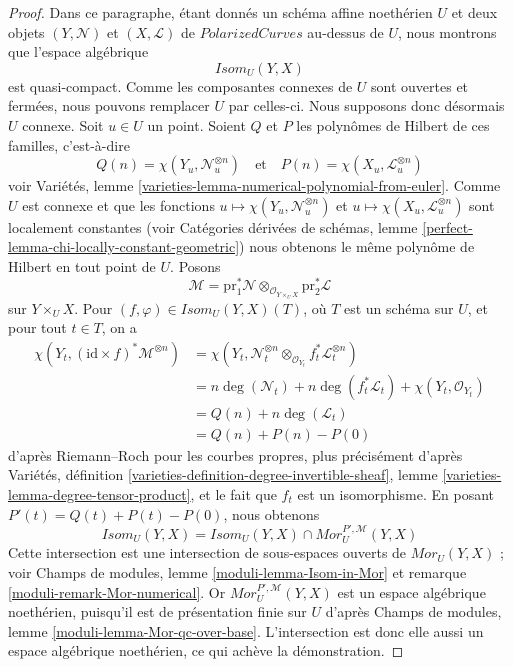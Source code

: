 \begin{proof}
\medskip\noindent
Dans ce paragraphe, étant donnés un schéma affine noethérien $U$ et deux objets
$(Y, \mathcal{N})$ et $(X, \mathcal{L})$
de $\textit{PolarizedCurves}$ au-dessus de $U$, nous montrons que l'espace algébrique
$$
\mathit{Isom}_U(Y, X)
$$
est quasi-compact. Comme les composantes connexes de $U$ sont ouvertes et
fermées, nous pouvons remplacer $U$ par celles-ci. Nous supposons donc
désormais $U$ connexe. Soit $u \in U$ un point. Soient $Q$ et $P$ les
polynômes de Hilbert de ces familles, c'est-à-dire
$$
Q(n) = \chi(Y_u, \mathcal{N}_u^{\otimes n})
\quad\text{et}\quad
P(n) = \chi(X_u, \mathcal{L}_u^{\otimes n})
$$
voir Variétés, lemme \ref{varieties-lemma-numerical-polynomial-from-euler}.
Comme $U$ est connexe et que les fonctions
$u \mapsto \chi(Y_u, \mathcal{N}_u^{\otimes n})$ et
$u \mapsto \chi(X_u, \mathcal{L}_u^{\otimes n})$
 sont localement constantes (voir
Catégories dérivées de schémas, lemme
\ref{perfect-lemma-chi-locally-constant-geometric})
nous obtenons le même polynôme de Hilbert en tout point de $U$.
Posons
$$
\mathcal{M} = \text{pr}_1^*\mathcal{N}
\otimes_{\mathcal{O}_{Y \times_U X}} \text{pr}_2^*\mathcal{L}
$$
sur $Y \times_U X$. Pour
$(f, \varphi) \in \mathit{Isom}_U(Y, X)(T)$, où $T$ est un schéma sur $U$,
et pour tout $t \in T$, on a
\begin{align*}
\chi(Y_t, (\text{id} \times f)^*\mathcal{M}^{\otimes n})
& =
\chi(Y_t,
\mathcal{N}_t^{\otimes n} \otimes_{\mathcal{O}_{Y_t}}
f_t^*\mathcal{L}_t^{\otimes n}) \\
& =
n\deg(\mathcal{N}_t) + n\deg(f_t^*\mathcal{L}_t) +
\chi(Y_t, \mathcal{O}_{Y_t}) \\
& =
Q(n) + n\deg(\mathcal{L}_t) \\
& =
Q(n) + P(n) - P(0)
\end{align*}
d'après Riemann--Roch pour les courbes propres, plus précisément d'après
Variétés, définition \ref{varieties-definition-degree-invertible-sheaf},
lemme \ref{varieties-lemma-degree-tensor-product},
et le fait que $f_t$ est un isomorphisme.
En posant $P'(t) = Q(t) + P(t) - P(0)$, nous obtenons
$$
\mathit{Isom}_U(Y, X) =
\mathit{Isom}_U(Y, X) \cap \mathit{Mor}^{P', \mathcal{M}}_U(Y, X)
$$
Cette intersection est une intersection de sous-espaces ouverts de
$\mathit{Mor}_U(Y, X)$ ; voir Champs de modules, lemme
\ref{moduli-lemma-Isom-in-Mor} et remarque
\ref{moduli-remark-Mor-numerical}.
Or $\mathit{Mor}^{P', \mathcal{M}}_U(Y, X)$
est un espace algébrique noethérien, puisqu'il est de présentation
finie sur $U$ d'après Champs de modules, lemme
\ref{moduli-lemma-Mor-qc-over-base}.
L'intersection est donc elle aussi un espace algébrique noethérien,
ce qui achève la démonstration.
\end{proof}

